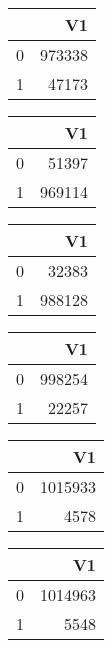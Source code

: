 \bigskip\bigskip
\centering
\begin{tabular}{rr}
  \hline
 & V1 \\ 
  \hline
0 & 973338 \\ 
  1 & 47173 \\ 
   \hline
\end{tabular}

\bigskip\bigskip
\centering
\begin{tabular}{rr}
  \hline
 & V1 \\ 
  \hline
0 & 51397 \\ 
  1 & 969114 \\ 
   \hline
\end{tabular}

\bigskip\bigskip
\centering
\begin{tabular}{rr}
  \hline
 & V1 \\ 
  \hline
0 & 32383 \\ 
  1 & 988128 \\ 
   \hline
\end{tabular}

\bigskip\bigskip
\centering
\begin{tabular}{rr}
  \hline
 & V1 \\ 
  \hline
0 & 998254 \\ 
  1 & 22257 \\ 
   \hline
\end{tabular}

\bigskip\bigskip
\centering
\begin{tabular}{rr}
  \hline
 & V1 \\ 
  \hline
0 & 1015933 \\ 
  1 & 4578 \\ 
   \hline
\end{tabular}

\bigskip\bigskip
\centering
\begin{tabular}{rr}
  \hline
 & V1 \\ 
  \hline
0 & 1014963 \\ 
  1 & 5548 \\ 
   \hline
\end{tabular}

